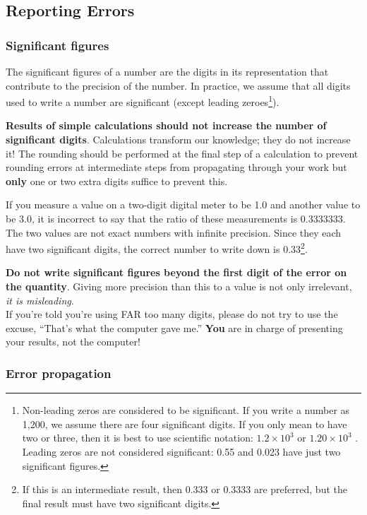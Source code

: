 \subsection{Reporting Errors}
\subsubsection{Significant figures}

The significant figures of a number are the digits in its representation that contribute to the precision of the number. In practice, we assume that all digits used to write a number are significant (except leading zeroes\footnote{Non-leading zeros are considered to be significant. If you write a number as 1,200, we assume there are four significant digits. If you only mean to have two or three, then it is best to use scientific notation: $1.2 \times 10^3$ or $1.20 \times 10^3$ . Leading zeros are not considered significant: 0.55 and 0.023 have just two significant figures.}).

\textbf{Results of simple calculations should not increase the number of significant digits}. Calculations transform our knowledge; they do not increase it! The rounding should be performed at the final step of a calculation to prevent rounding errors at intermediate steps from propagating through your work but \textbf{only} one or two
extra digits suffice to prevent this.

If you measure a value on a two-digit digital meter to be 1.0 and another value to be 3.0, it is incorrect to say that the ratio of these measurements is 0.3333333. The two values are not exact numbers with infinite precision. Since they each have two significant digits, the correct number to write down is 0.33\footnote{If this is an intermediate result, then 0.333 or 0.3333 are preferred, but the final result must have two significant digits.}.

\begin{imp}
\textbf{Do not write significant figures beyond the first digit of the error on the quantity}. Giving more precision than this to a value is not only irrelevant, \textit{it is misleading}.\\

If you're told you're using FAR too many digits, please do not try to use the excuse, ``That's what the computer gave me.'' \textbf{You} are in charge of presenting your results, not the computer!
\end{imp}


\subsubsection{Error propagation}


